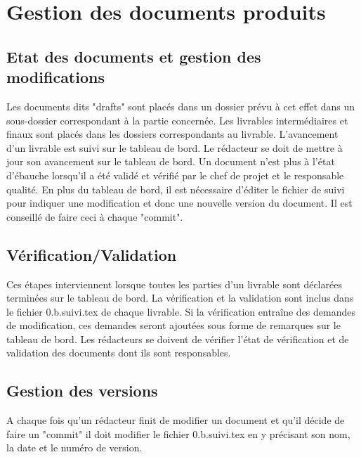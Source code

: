 \section{Gestion des documents produits}
\subsection{Etat des documents et gestion des modifications}
Les documents dits "drafts" sont placés dans un dossier prévu à cet effet dans
un sous-dossier correspondant à la partie concernée. 
Les livrables intermédiaires et finaux sont placés dans les dossiers 
correspondants au livrable.
L'avancement d'un livrable est suivi sur le tableau de bord. Le rédacteur se
doit de mettre à jour son avancement sur le tableau de bord.
Un document n'est plus à l'état d'ébauche lorsqu'il a été validé et vérifié par 
le chef de projet et le responsable qualité.
En plus du tableau de bord, il est nécessaire d'éditer le fichier de suivi
pour indiquer une modification et donc une nouvelle version du document. Il est
conseillé de faire ceci à chaque "commit".

\subsection{Vérification/Validation}
Ces étapes interviennent lorsque toutes les parties d'un livrable sont 
déclarées terminées sur le tableau de bord.
La vérification et la validation sont inclus dans le fichier 0.b.suivi.tex de 
chaque livrable. Si la vérification entraîne des demandes de modification, 
ces demandes seront ajoutées sous forme de remarques sur le tableau de bord.
Les rédacteurs se doivent de vérifier l'état de vérification et de validation
des documents dont ils sont responsables.

\subsection{Gestion des versions}
A chaque fois qu'un rédacteur finit de modifier un document et qu'il décide 
de faire un "commit" il doit modifier le fichier 0.b.suivi.tex en y précisant 
son nom, la date et le numéro de version.

